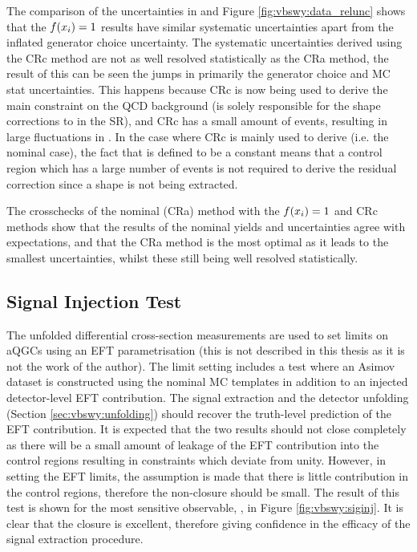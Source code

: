 The comparison of the uncertainties in  and Figure \ref{fig:vbswy:data_relunc} shows that the $f(x_i)=1$ results have similar systematic uncertainties apart from the inflated generator choice uncertainty. The systematic uncertainties derived using the CRc method are not as well resolved statistically as the CRa method, the result of this can be seen the jumps in primarily the generator choice and MC stat uncertainties. This happens because CRc is now being used to derive the main constraint on the QCD background \bl (\bl is solely responsible for the shape corrections to \qcdwy in the SR), and CRc has a small amount of \qcdwy events, resulting in large fluctuations in \bl. In the case where CRc is mainly used to derive \fx (i.e. the nominal case), the fact that \fx is defined to be a constant means that a control region which has a large number of events is not required to derive the residual correction since a shape is not being extracted. 

The crosschecks of the nominal (CRa) method with the $f(x_i)=1$ and CRc methods show that the results of the nominal yields and uncertainties agree with expectations, and that the CRa method is the most optimal as it leads to the smallest uncertainties, whilst these still being well resolved statistically.

\subsection{Signal Injection Test}

The unfolded differential cross-section measurements are used to set limits on aQGCs using an EFT parametrisation (this is not described in this thesis as it is not the work of the author). The limit setting includes a test where an Asimov dataset is constructed using the nominal MC templates in addition to an injected detector-level EFT contribution. The signal extraction and the detector unfolding (Section \ref{sec:vbswy:unfolding}) should recover the truth-level prediction of the EFT contribution. It is expected that the two results should not close completely as there will be a small amount of leakage of the EFT contribution into the control regions resulting in \qcdwy constraints which deviate from unity. However, in setting the EFT limits, the assumption is made that there is little contribution in the control regions, therefore the non-closure should be small. The result of this test is shown for the most sensitive observable, \jjpt, in Figure \ref{fig:vbswy:siginj}. It is clear that the closure is excellent, therefore giving confidence in the efficacy of the signal extraction procedure.

